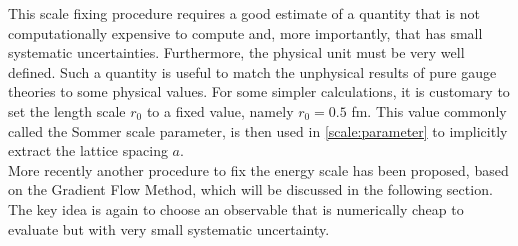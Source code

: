 This scale fixing procedure requires a good estimate of a quantity that is not computationally expensive to compute and, more importantly, that has small systematic uncertainties. Furthermore, the physical unit must be very well defined. Such a quantity is useful to match the unphysical results of pure gauge theories to some physical values. For some simpler calculations, it is customary to set the length scale $r_0$ to a fixed value, namely $r_0 = 0.5$ fm. This value commonly called the Sommer scale parameter, is then used in \cref{scale:parameter} to implicitly extract the lattice spacing $a$. \\
More recently another procedure to fix the energy scale has been proposed, based on the Gradient Flow Method, which will be discussed in the following section. The key idea is again to choose an observable that is numerically cheap to evaluate but with very small systematic uncertainty.

